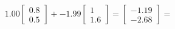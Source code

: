 \documentclass[preview]{standalone}
\begin{document}
\begin{align*}
1.00 \begin{bmatrix} 0.8 \\ 0.5 \end{bmatrix} + -1.99 \begin{bmatrix} 1 \\ 1.6 \end{bmatrix} = \begin{bmatrix} -1.19 \\ -2.68 \end{bmatrix} =
\end{align*}
\end{document}
